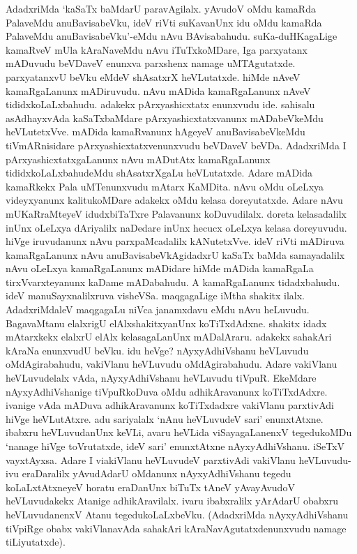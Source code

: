 AdadxriMda `kaSaTx baMdarU paravAgilalx. yAvudoV oMdu kamaRda PalaveMdu anuBavisabeVku, ideV riVti suKavanUnx idu oMdu kamaRda PalaveMdu anuBavisabeVku'-eMdu nAvu BAvisabahudu. suKa-duHKagaLige kamaRveV mUla kAraNaveMdu nAvu iTuTxkoMDare, Iga parxyatanx mADuvudu beVDaveV enunxva parxshenx namage uMTAgutatxde. parxyatanxvU beVku eMdeV shAsatxrX heVLutatxde. hiMde nAveV kamaRgaLanunx mADiruvudu. nAvu mADida kamaRgaLanunx nAveV tididxkoLaLxbahudu. adakekx pArxyashicxtatx enunxvudu ide. sahisalu asAdhayxvAda kaSaTxbaMdare pArxyashicxtatxvanunx mADabeVkeMdu heVLutetxVve. mADida kamaRvanunx hAgeyeV anuBavisabeVkeMdu tiVmARnisidare pArxyashicxtatxvenunxvudu beVDaveV beVDa. AdadxriMda I pArxyashicxtatxgaLanunx nAvu mADutAtx kamaRgaLanunx tididxkoLaLxbahudeMdu shAsatxrXgaLu heVLutatxde. Adare mADida kamaRkekx Pala uMTenunxvudu mAtarx KaMDita. nAvu oMdu oLeLxya videyxyanunx kalitukoMDare adakekx oMdu kelasa doreyutatxde. Adare nAvu mUKaRraMteyeV idudxbiTaTxre Palavanunx koDuvudilalx. doreta kelasadalilx inUnx oLeLxya dAriyalilx naDedare inUnx hecucx oLeLxya kelasa doreyuvudu. hiVge iruvudanunx nAvu parxpaMcadalilx kANutetxVve. ideV riVti mADiruva kamaRgaLanunx nAvu anuBavisabeVkAgidadxrU kaSaTx baMda samayadalilx nAvu oLeLxya kamaRgaLanunx mADidare hiMde mADida kamaRgaLa tirxVvarxteyanunx kaDame mADabahudu. A kamaRgaLanunx tidadxbahudu. ideV manuSayxnalilxruva visheVSa. maqgagaLige iMtha shakitx ilalx. AdadxriMdaleV maqgagaLu niVca janamxdavu eMdu nAvu heLuvudu. BagavaMtanu elalxrigU elAlxshakitxyanUnx koTiTxdAdxne. shakitx idadx mAtarxkekx elalxrU elAlx kelasagaLanUnx mADalAraru. adakekx sahakAri kAraNa enunxvudU beVku. idu heVge? nAyxyAdhiVshanu heVLuvudu oMdAgirabahudu, vakiVlanu heVLuvudu oMdAgirabahudu. Adare vakiVlanu heVLuvudelalx vAda, nAyxyAdhiVshanu heVLuvudu tiVpuR. EkeMdare nAyxyAdhiVshanige tiVpuRkoDuva oMdu adhikAravanunx koTiTxdAdxre. ivanige vAda mADuva adhikAravanunx koTiTxdadxre vakiVlanu parxtivAdi hiVge heVLutAtxre. adu sariyalalx `nAnu heVLuvudeV sari' enunxtAtxne. ibabxru heVLuvudanUnx keVLi, avaru heVLida viSayagaLanenxV tegedukoMDu `nanage hiVge toVrutatxde, ideV sari' enunxtAtxne nAyxyAdhiVshanu. iSeTxV vayxtAyxsa. Adare I viakiVlanu heVLuvudeV parxtivAdi vakiVlanu heVLuvudu-ivu eraDaralilx yAvudAdarU oMdanunx nAyxyAdhiVshanu tegedu koLaLxtAtxneyeV horatu eraDanUnx biTuTx tAneV yAvayAvudoV heVLuvudakekx Atanige adhikAravilalx. ivaru ibabxralilx yArAdarU obabxru heVLuvudanenxV Atanu tegedukoLaLxbeVku. (AdadxriMda nAyxyAdhiVshanu tiVpiRge obabx vakiVlanavAda sahakAri kAraNavAgutatxdenunxvudu namage tiLiyutatxde). 

